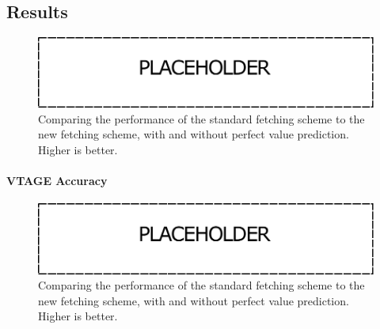 \subsection{Results}
\begin{figure}[t]
    \centering
    \includegraphics[width=1\textwidth]{chapter3/graphics/wip.pdf}
    \caption{Comparing the performance of the standard fetching scheme to the new fetching scheme, with and without perfect value prediction. Higher is better.}
    \label{fig:vtag_perf}
	\vspace{1em}
\end{figure}

\paragraph*{VTAGE Accuracy}
\begin{figure}[t]
    \centering
    \includegraphics[width=1\textwidth]{chapter3/graphics/wip.pdf}
    \caption{Comparing the performance of the standard fetching scheme to the new fetching scheme, with and without perfect value prediction. Higher is better.}
    \label{fig:vtag_accuracy}
	\vspace{1em}
\end{figure}